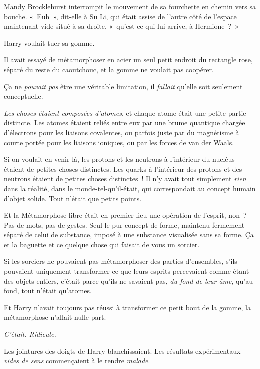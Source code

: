 \later

Mandy Brocklehurst interrompit le mouvement de sa fourchette en chemin vers sa bouche. «~Euh~», dit-elle à Su Li, qui était assise de l'autre côté de l'espace maintenant vide situé à sa droite, «~qu'est-ce qui lui arrive, à Hermione~?~»

\later

Harry voulait tuer sa gomme.

Il avait essayé de métamorphoser en acier un seul petit endroit du rectangle rose, séparé du reste du caoutchouc, et la gomme ne voulait pas coopérer.

Ça ne \emph{pouvait pas} être une véritable limitation, il \emph{fallait} qu'elle soit seulement conceptuelle.

\emph{Les choses étaient composées d'atomes}, et chaque atome était une petite partie distincte. Les atomes étaient reliés entre eux par une brume quantique chargée d'électrons pour les liaisons covalentes, ou parfois juste par du magnétisme à courte portée pour les liaisons ioniques, ou par les forces de van der Waals.

Si on voulait en venir là, les protons et les neutrons à l'intérieur du nucléus étaient de petites choses distinctes. Les quarks à l'intérieur des protons et des neutrons étaient de petites choses distinctes~! Il n'y avait tout simplement \emph{rien} dans la réalité, dans le monde-tel-qu'il-était, qui correspondait au concept humain d'objet solide. Tout n'était que petits points.

Et la Métamorphose libre était en premier lieu une opération de l'esprit, non~? Pas de mots, pas de gestes. Seul le pur concept de forme, maintenu fermement séparé de celui de substance, imposé à une substance visualisée sans sa forme. Ça et la baguette et ce quelque chose qui faisait de vous un sorcier.

Si les sorciers ne pouvaient pas métamorphoser des parties d'ensembles, s'ils pouvaient uniquement transformer ce que leurs esprits percevaient comme étant des objets entiers, c'était parce qu'ils ne savaient pas, \emph{du fond de leur âme}, qu'au fond, tout n'était qu'atomes.

Et Harry n'avait toujours pas réussi à transformer ce petit bout de la gomme, la métamorphose n'allait nulle part.

\emph{C'était. Ridicule.}

Les jointures des doigts de Harry blanchissaient. Les résultats expérimentaux \emph{vides de sens} commençaient à le rendre \emph{malade}.

